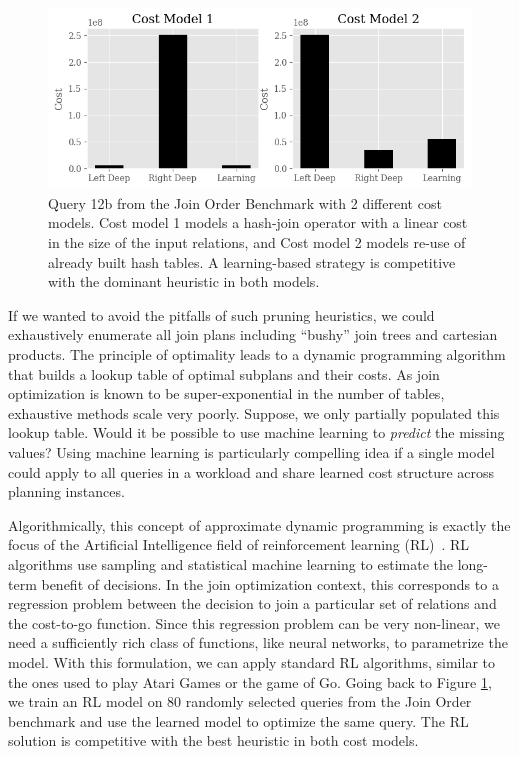 \begin{figure}
    \centering
    \includegraphics[width=\columnwidth]{figs/teaser.png}
    \caption{\small Query 12b from the Join Order Benchmark with 2 different cost models. Cost model 1 models a hash-join operator with a linear cost in the size of the input relations, and Cost model 2 models re-use of already built hash tables. A learning-based strategy is competitive with the dominant heuristic in both models. \label{teaser}}
\end{figure}

If we wanted to avoid the pitfalls of such pruning heuristics, we could exhaustively enumerate all join plans including ``bushy'' join trees and cartesian products.
The principle of optimality leads to a dynamic programming algorithm that builds a lookup table of optimal subplans and their costs. 
As join optimization is known to be super-exponential in the number of tables, exhaustive methods scale very poorly.
Suppose, we only partially populated this lookup table.
Would it be possible to use machine learning to \emph{predict} the missing values?
Using machine learning is particularly compelling idea if a single model could apply to all queries in a workload and share learned cost structure across planning instances.

Algorithmically, this concept of approximate dynamic programming is exactly the focus of the Artificial Intelligence field of reinforcement learning (RL)~\cite{sutton1998reinforcement}. RL algorithms use sampling and statistical machine learning to estimate the long-term benefit of decisions.
In the join optimization context, this corresponds to a regression problem between the decision to join a particular set of relations and the cost-to-go function.
Since this regression problem can be very non-linear, we need a sufficiently rich class of functions, like neural networks, to parametrize the model.
With this formulation, we can apply standard RL algorithms, similar to the ones used to play Atari Games or the game of Go.
Going back to Figure \ref{teaser}, we train an RL model on 80 randomly selected queries from the Join Order benchmark and use the learned model to optimize the same query. The RL solution is competitive with the best heuristic in both cost models.

